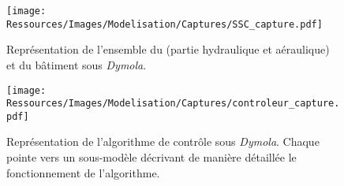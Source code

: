 
\begin{landscape}

\begin{figure}
    \centering
    \texttt{[image: Ressources/Images/Modelisation/Captures/SSC\_capture.pdf]}
    \caption[Représentation de l’ensemble du  et du bâtiment sous \textit{Dymola}]
            {Représentation de l’ensemble du  (partie hydraulique et aéraulique)
             et du bâtiment sous \textit{Dymola}.}
             \label{fig:dymola_ssc_batiment}
\end{figure}

\begin{figure}
    \centering
    \texttt{[image: Ressources/Images/Modelisation/Captures/controleur\_capture.pdf]}
    \caption[Représentation de l’algorithme de contrôle sous \textit{Dymola}]
            {Représentation de l’algorithme de contrôle sous \textit{Dymola}. Chaque 
             pointe vers un sous-modèle décrivant de manière détaillée le fonctionnement de l’algorithme.}
             \label{fig:dymola_ssc_controle}
\end{figure}

\end{landscape}


